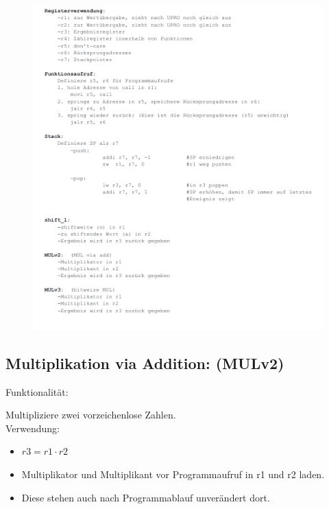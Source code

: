 \documentclass[fleqn, a4paper, 1pt]{article}       %
\begin{document}
\begin{figure}[h]
    \includegraphics[width =1\textwidth]{Manual.png}
\label{fig:bitw_Mul_Prinzip}
\end{figure}

\newpage

\subsection{Multiplikation via Addition: (MULv2)}
Funktionalität:

Multipliziere zwei vorzeichenlose Zahlen.
\\

\noindent Verwendung:
\begin{itemize}
	\item $r3 = r1 \cdot r2$
	\item Multiplikator und Multiplikant vor Programmaufruf  in r1                und r2 laden.
	\item Diese stehen auch nach Programmablauf unverändert                dort.
\end{itemize}
\end{document}
